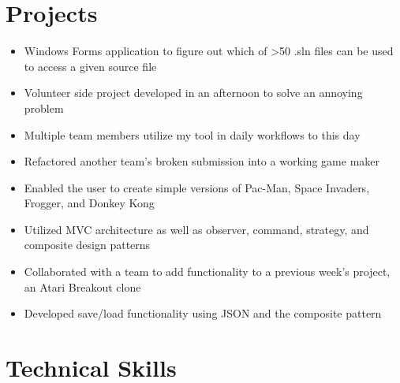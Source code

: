 \documentclass[10pt,a4paper,sans]{moderncv}
\begin{document}
\section{Projects}
\begin{itemize}
\item Windows Forms application to figure out which of >50 .sln files can be used to access a given source file 
\item Volunteer side project developed in an afternoon to solve an annoying problem
\item Multiple team members utilize my tool in daily workflows to this day
\end{itemize}

\begin{itemize}
\item Refactored another team's broken submission into a working game maker
\item Enabled the user to create simple versions of Pac-Man, Space Invaders, Frogger, and Donkey Kong
\item Utilized MVC architecture as well as observer, command, strategy, and composite design patterns
\end{itemize}
\begin{itemize}
\item Collaborated with a team to add functionality to a previous week’s project, an Atari Breakout clone
\item Developed save/load functionality using JSON and the composite pattern
\end{itemize}

\section{Technical Skills}
\end{document}

